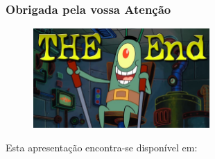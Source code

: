 \documentclass[hyperref={pdfpagelabels=true}]{beamer}
\begin{document}



\begin{frame}
\frametitle{Obrigada pela vossa Aten\c{c}\~{a}o}
    \begin{figure}   
      \includegraphics[width=0.6\textwidth]{end.jpg}      
    \end{figure}   
    Esta apresenta\c{c}\~{a}o encontra-se dispon\'{i}vel em: 
      \vspace{5mm}    
\end{frame}
\end{document}
